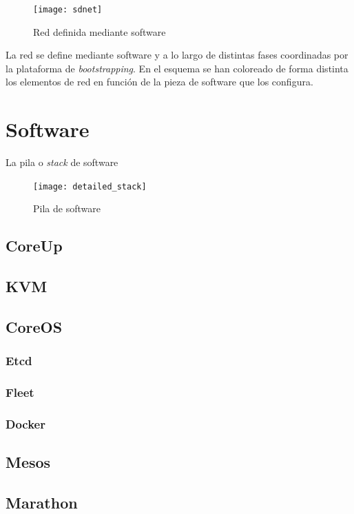 \documentclass[a4paper,12pt,spanish,final]{epsc_tfc_pfc}
\begin{document}
\begin{figure}[h]
  \centering
    \texttt{[image: sdnet]}
      \caption{Red definida mediante software}
\end{figure}

La red se define mediante software y a lo largo de distintas fases coordinadas por la plataforma de \emph{bootstrapping}. En el esquema se han coloreado de forma distinta los elementos de red en función de la pieza de software que los configura.

\section{Software}

La pila o \emph{stack} de software

\begin{figure}[h]
  \centering
    \texttt{[image: detailed\_stack]}
      \caption{Pila de software}
\end{figure}

\subsection{CoreUp}
\subsection{KVM}
\subsection{CoreOS}
\subsubsection{Etcd}
\subsubsection{Fleet}
\subsubsection{Docker}
\subsection{Mesos}
\subsection{Marathon}

\end{document}

